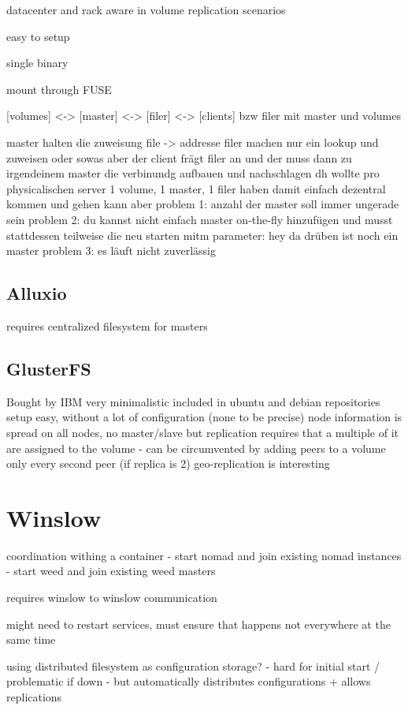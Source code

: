 datacenter and rack aware in volume replication scenarios

easy to setup

single binary

mount through FUSE


[volumes] <-> [master] <-> [filer] <-> [clients]
bzw filer mit master und volumes

master halten die zuweisung file -> addresse
filer machen nur ein lookup und zuweisen oder sowas
aber der client frägt filer an
und der muss dann zu irgendeinem master die verbinundg aufbauen und nachschlagen
dh wollte pro physicalischen server 1 volume, 1 master, 1 filer haben
damit einfach dezentral kommen und gehen kann
aber problem 1: anzahl der master soll immer ungerade sein
problem 2: du kannst nicht einfach master on-the-fly hinzufügen und musst stattdessen teilweise die neu starten mitm parameter: hey da drüben ist noch ein master
problem 3: es läuft nicht zuverlässig

\subsection{Alluxio}

requires centralized filesystem for masters

\cite{alluxio:main}

\subsection{GlusterFS}

\cite{glusterfs:main}

Bought by IBM
very minimalistic
included in ubuntu and debian repositories
setup easy, without a lot of configuration (none to be precise)
node information is spread on all nodes, no master/slave
but replication requires that a multiple of it are assigned to the volume - can be circumvented by adding peers to a volume only every second peer (if replica is 2)
geo-replication is interesting

\section{Winslow}
\cite{wiki:winslow:person}

coordination withing a container
 - start nomad and join existing nomad instances
 - start weed and join existing weed masters
 
requires winslow to winslow communication

might need to restart services, must ensure that happens not everywhere at the same time

using distributed filesystem as configuration storage?
 - hard for initial start / problematic if down
 - but automatically distributes configurations + allows replications